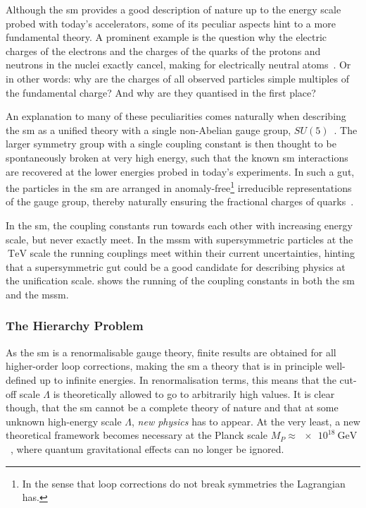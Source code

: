Although the \gls{sm} provides a good description of nature up to the energy scale probed with today's accelerators, some of its peculiar aspects hint to a more fundamental theory. A prominent example is the question why the electric charges of the electrons and the charges of the quarks of the protons and neutrons in the nuclei exactly cancel, making for electrically neutral atoms~\cite{Brock:1354959}. Or in other words: why are the charges of all observed particles simple multiples of the fundamental charge? And why are they quantised in the first place?

An explanation to many of these peculiarities comes naturally when describing the \gls{sm} as a unified theory with a single non-Abelian gauge group, \eg $SU(5)$~\cite{PhysRevLett.32.438}. The larger symmetry group with a single coupling constant is then thought to be spontaneously broken at very high energy, such that the known \gls{sm} interactions are recovered at the lower energies probed in today's experiments. In such a \gls{gut}, the particles in the \gls{sm} are arranged in anomaly-free\footnote{In the sense that loop corrections do not break symmetries the Lagrangian has.} irreducible representations of the gauge group, thereby \eg naturally ensuring the fractional charges of quarks~\cite{Peskin:1995ev}.

In the \gls{sm}, the coupling constants run towards each other with increasing energy scale, but never exactly meet. In the \gls{mssm} with supersymmetric particles at the $\SI{}{\TeV}$ scale the running couplings meet within their current uncertainties, hinting that a supersymmetric \gls{gut} could be a good candidate for describing physics at the unification scale.  shows the running of the coupling constants in both the \gls{sm} and the \gls{mssm}.

\subsubsection{The Hierarchy Problem}

As the \gls{sm} is a renormalisable gauge theory, finite results are obtained for all higher-order loop corrections, making the \gls{sm} a theory that is in principle well-defined up to infinite energies. In renormalisation terms, this means that the cut-off scale $\Lambda$ is theoretically allowed to go to arbitrarily high values. It is clear though, that the \gls{sm} cannot be a complete theory of nature and that at some unknown high-energy scale $\Lambda$, \textit{new physics} has to appear. At the very least, a new theoretical framework becomes necessary at the Planck scale $M_P \approx \SI{e18}{\GeV}$~\cite{Martin:1997ns}, where quantum gravitational effects can no longer be ignored.

